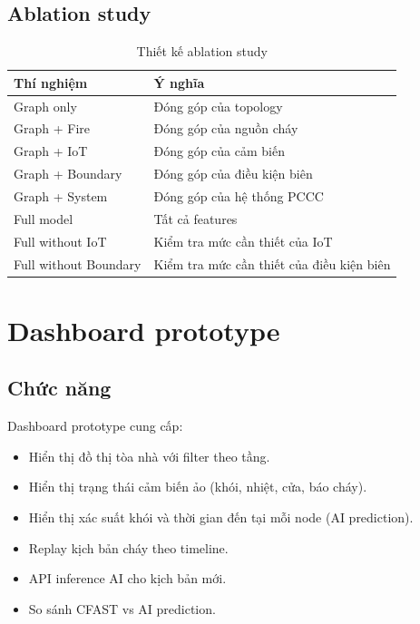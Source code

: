 \subsection{Ablation study}

\begin{table}[H]
\centering
\caption{Thiết kế ablation study}
\label{tab:ablation}
\begin{tabularx}{\textwidth}{l X}
\toprule
\textbf{Thí nghiệm} & \textbf{Ý nghĩa} \\
\midrule
Graph only               & Đóng góp của topology \\
Graph + Fire             & Đóng góp của nguồn cháy \\
Graph + IoT              & Đóng góp của cảm biến \\
Graph + Boundary         & Đóng góp của điều kiện biên \\
Graph + System           & Đóng góp của hệ thống PCCC \\
Full model               & Tất cả features \\
Full without IoT         & Kiểm tra mức cần thiết của IoT \\
Full without Boundary    & Kiểm tra mức cần thiết của điều kiện biên \\
\bottomrule
\end{tabularx}
\end{table}

\section{Dashboard prototype}
\label{sec:dashboard}

\subsection{Chức năng}

Dashboard prototype cung cấp:
\begin{itemize}
  \item Hiển thị đồ thị tòa nhà với filter theo tầng.
  \item Hiển thị trạng thái cảm biến ảo (khói, nhiệt, cửa, báo cháy).
  \item Hiển thị xác suất khói và thời gian đến tại mỗi node (AI prediction).
  \item Replay kịch bản cháy theo timeline.
  \item API inference AI cho kịch bản mới.
  \item So sánh CFAST vs AI prediction.
\end{itemize}

